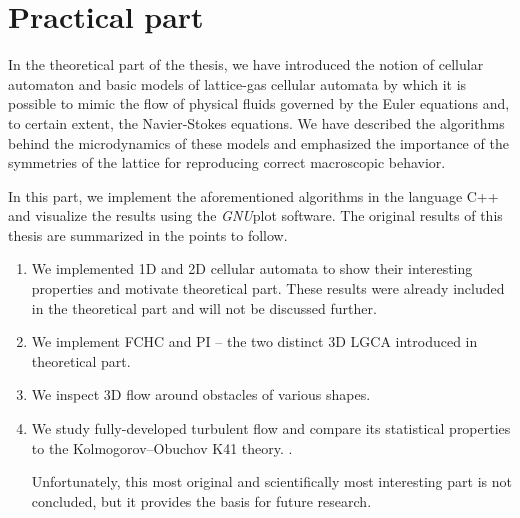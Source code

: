 

\chapter{Practical part}

In the theoretical part of the thesis, we have introduced the notion of cellular automaton and basic models of lattice-gas cellular automata by which it is possible to mimic the flow of physical fluids governed by the Euler equations and, to certain extent, the Navier-Stokes equations.
We have described the algorithms behind the microdynamics of these models and emphasized the importance of the symmetries of the lattice for reproducing correct macroscopic behavior.

In this part, we implement the aforementioned algorithms in the language C++ and visualize the results using the \textit{GNU}plot software. The original results of this thesis are summarized in the points to follow.



\begin{enumerate}
\item We implemented 1D and 2D cellular automata to show their interesting properties and motivate theoretical part. These results were already included in the theoretical part and will not be discussed further.
\item We implement FCHC and PI -- the two distinct 3D LGCA introduced in theoretical part.
\item We inspect 3D flow around obstacles of various shapes.
\item We study fully-developed turbulent flow and compare its statistical pro\-perties to the Kolmogorov--Obuchov K41 theory. \cite{wolf}.

Unfortunately, this most original and scientifically most interesting part is not concluded, but it provides the basis for future research. 

\end{enumerate}
